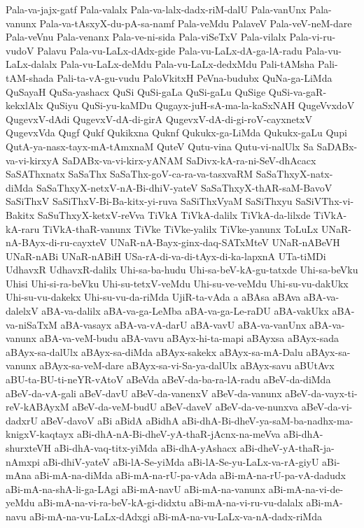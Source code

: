 {Pala-va-jajx-gatf
Pala-valalx
Pala-va-lalx-dadx-riM-dalU
Pala-vanUnx
Pala-vanunx
Pala-va-tAsxyX-du-pA-sa-namf
Pala-veMdu
PalaveV
Pala-veV-neM-dare
Pala-veVnu
Pala-venanx
Pala-ve-ni-sida
Pala-viSeTxV
Pala-vilalx
Pala-vi-ru-vudoV
Palavu
Pala-vu-LaLx-dAdx-gide
Pala-vu-LaLx-dA-ga-lA-radu
Pala-vu-LaLx-dalalx
Pala-vu-LaLx-deMdu
Pala-vu-LaLx-dedxMdu
Pali-tAMsha
Pali-tAM-shada
Pali-ta-vA-gu-vudu
PaloVkitxH
PeVna-budubx
QuNa-ga-LiMda
QuSayaH
QuSa-yashacx
QuSi
QuSi-gaLa
QuSi-gaLu
QuSige
QuSi-va-gaR-kekxlAlx
QuSiyu
QuSi-yu-kaMDu
Qugayx-juH-sA-ma-la-kaSxNAH
QugeVvxdoV
QugevxV-dAdi
QugevxV-dA-di-girA
QugevxV-dA-di-gi-roV-cayxnetxV
QugevxVda
Qugf
Qukf
Qukikxna
Quknf
Qukukx-ga-LiMda
Qukukx-gaLu
Qupi
QutA-ya-nasx-tayx-mA-tAmxnaM
QuteV
Qutu-vina
Qutu-vi-nalUlx
Sa
SaDABx-va-vi-kirxyA
SaDABx-va-vi-kirx-yANAM
SaDivx-kA-ra-ni-SeV-dhAcacx
SaSAThxnatx
SaSaThx
SaSaThx-goV-ca-ra-va-tasxvaRM
SaSaThxyX-natx-diMda
SaSaThxyX-netxV-nA-Bi-dhiV-yateV
SaSaThxyX-thAR-saM-BavoV
SaSiThxV
SaSiThxV-Bi-Ba-kitx-yi-ruva
SaSiThxVyaM
SaSiThxyu
SaSiVThx-vi-Bakitx
SaSuThxyX-ketxV-reVva
TiVkA
TiVkA-dalilx
TiVkA-da-lilxde
TiVkA-kA-raru
TiVkA-thaR-vanunx
TiVke
TiVke-yalilx
TiVke-yanunx
ToLuLx
UNaR-nA-BAyx-di-ru-cayxteV
UNaR-nA-Bayx-ginx-daq-SATxMteV
UNaR-nABeVH
UNaR-nABi
UNaR-nABiH
USa-rA-di-va-di-tAyx-di-ka-lapxnA
UTa-tiMDi
UdhavxR
UdhavxR-dalilx
Uhi-sa-ba-hudu
Uhi-sa-beV-kA-gu-tatxde
Uhi-sa-beVku
Uhisi
Uhi-si-ra-beVku
Uhi-su-tetxV-veMdu
Uhi-su-ve-veMdu
Uhi-su-vu-dakUkx
Uhi-su-vu-dakekx
Uhi-su-vu-da-riMda
UjiR-ta-vAda
a
aBAsa
aBAva
aBA-va-dalelxV
aBA-va-dalilx
aBA-va-ga-LeMba
aBA-va-ga-Le-raDU
aBA-vakUkx
aBA-va-niSaTxM
aBA-vasayx
aBA-va-vA-darU
aBA-vavU
aBA-va-vanUnx
aBA-va-vanunx
aBA-va-veM-budu
aBA-vavu
aBAyx-hi-ta-mapi
aBAyxsa
aBAyx-sada
aBAyx-sa-dalUlx
aBAyx-sa-diMda
aBAyx-sakekx
aBAyx-sa-mA-Dalu
aBAyx-sa-vanunx
aBAyx-sa-veM-dare
aBAyx-sa-vi-Sa-ya-dalUlx
aBAyx-savu
aBUtAvx
aBU-ta-BU-ti-neYR-vAtoV
aBeVda
aBeV-da-ba-ra-lA-radu
aBeV-da-diMda
aBeV-da-vA-gali
aBeV-davU
aBeV-da-vanenxV
aBeV-da-vanunx
aBeV-da-vayx-ti-reV-kABAyxM
aBeV-da-veM-budU
aBeV-daveV
aBeV-da-ve-nunxva
aBeV-da-vi-dadxrU
aBeV-davoV
aBi
aBidA
aBidhA
aBi-dhA-Bi-dheV-ya-saM-ba-nadhx-ma-knigxV-kaqtayx
aBi-dhA-nA-Bi-dheV-yA-thaR-jAcnx-na-meVva
aBi-dhA-shurxteVH
aBi-dhA-vaq-titx-yiMda
aBi-dhA-yAshacx
aBi-dheV-yA-thaR-ja-nAmxpi
aBi-dhiV-yateV
aBi-lA-Se-yiMda
aBi-lA-Se-yu-LaLx-va-rA-giyU
aBi-mAna
aBi-mA-na-diMda
aBi-mA-na-rU-pa-vAda
aBi-mA-na-rU-pa-vA-dadudx
aBi-mA-na-shA-li-ga-LAgi
aBi-mA-navU
aBi-mA-na-vanunx
aBi-mA-na-vi-de-yeMdu
aBi-mA-na-vi-ra-beV-kA-gi-didxtu
aBi-mA-na-vi-ru-vu-dalalx
aBi-mA-navu
aBi-mA-na-vu-LaLx-dAdxgi
aBi-mA-na-vu-LaLx-va-nA-dadx-riMda
}
